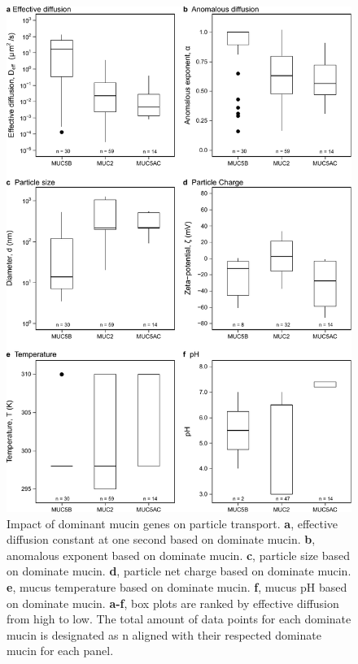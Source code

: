 \documentclass[a4paper]{article}
\begin{document}
\begin{figure}[H]
    \centering
    \includegraphics[width = 12 cm]{Figure_Dominant_Mucin.pdf}
    \caption{Impact of dominant mucin genes on particle transport. \textbf{a}, effective diffusion constant at one second based on dominate mucin. \textbf{b}, anomalous exponent based on dominate mucin. \textbf{c}, particle size based on dominate mucin. \textbf{d},  particle net charge based on dominate mucin. \textbf{e}, mucus temperature based on dominate mucin. \textbf{f}, mucus pH based on dominate mucin.  \textbf{a-f}, box plots are ranked by effective diffusion from high to low. The total amount of data points for each dominate mucin is designated as n aligned with their respected dominate mucin for each panel.
    }
    \label{fig:DommucBOX}
\end{figure}

\clearpage
\end{document}

